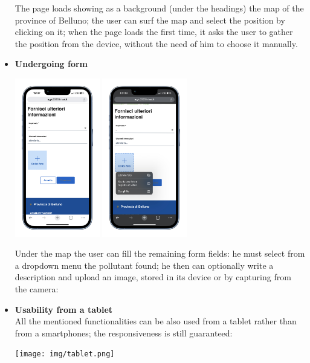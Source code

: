 \begin{itemize}
    The page loads showing as a background (under the headings) the map of the province of Belluno; the user can surf the map and select the position by clicking on it; when the page loads the first time, it asks the user to gather the position from the device, without the need of him to choose it manually. \\
    \item \textbf{Undergoing form} \\
    \begin{center} \includegraphics[width=10em]{img/form.png} \includegraphics[width=10em]{img/foto.png} \end{center}
    Under the map the user can fill the remaining form fields: he must select from a dropdown menu the pollutant found; he then can optionally write a description and upload an image, stored in its device or by capturing from the camera:
    \item \textbf{Usability from a tablet} \\
    All the mentioned functionalities can be also used from a tablet rather than from a smartphones; the responsiveness is still guaranteed: 
    \begin{center} \texttt{[image: img/tablet.png]} \end{center}
\end{itemize} 
